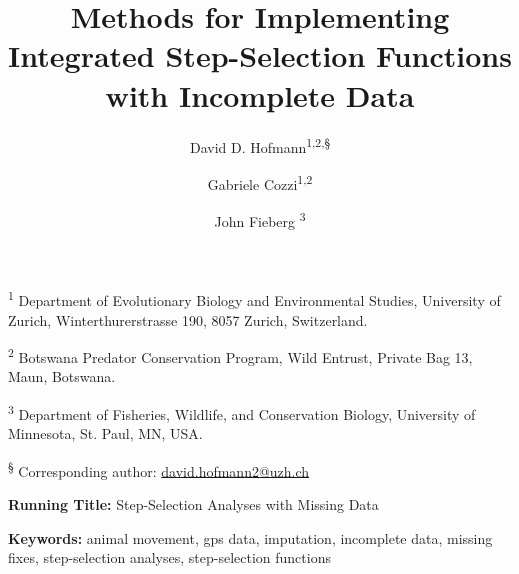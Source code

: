 \documentclass[abstract=on,10pt,a4paper,bibliography=totocnumbered]{article}
\title{Methods for Implementing Integrated Step-Selection Functions with
Incomplete Data}
\author{
  David D. Hofmann\textsuperscript{1,2,\S} \orcid{0000-0003-3477-4365} \and
  Gabriele Cozzi\textsuperscript{1,2} \orcid{0000-0002-1744-1940} \and
  John Fieberg \textsuperscript{3} \orcid{0000-0002-3180-7021}
}
\begin{document}

\maketitle

\begin{flushleft}

\vspace{0.5cm}

\textsuperscript{1} Department of Evolutionary Biology and Environmental
Studies, University of Zurich, Winterthurerstrasse 190, 8057 Zurich,
Switzerland.

\textsuperscript{2} Botswana Predator Conservation Program, Wild Entrust,
Private Bag 13, Maun, Botswana.

\textsuperscript{3} Department of Fisheries, Wildlife, and Conservation Biology,
University of Minnesota, St. Paul, MN, USA.

\textsuperscript{\S} Corresponding author: \href{mailto://david.hofmann2@uzh.ch}{david.hofmann2@uzh.ch}

\vspace{4cm}

\textbf{Running Title:} Step-Selection Analyses with Missing Data

\vspace{0.5cm}

\textbf{Keywords:} animal movement, gps data, imputation, incomplete data,
missing fixes, step-selection analyses, step-selection functions

\end{flushleft}
\end{document}
